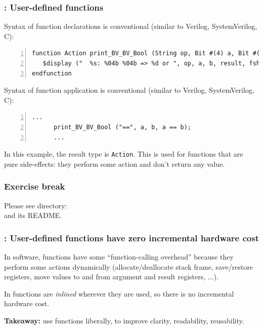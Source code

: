 \begin{frame}[fragile]
\frametitle{{\BSV}: User-defined functions}

\footnotesize

Syntax of function declarations is conventional (similar to Verilog,
SystemVerilog, C):

\begin{Verbatim}[frame=single, numbers=left]
function Action print_BV_BV_Bool (String op, Bit #(4) a, Bit #(4) b, Bool result);
   $display ("  %s: %04b %04b => %d or ", op, a, b, result, fshow (result));
endfunction
\end{Verbatim}

\vspace{4ex}

Syntax of function application is conventional (similar to Verilog,
SystemVerilog, C):

\begin{Verbatim}[frame=single, numbers=left]
      ...
      print_BV_BV_Bool ("==", a, b, a == b);
      ...
\end{Verbatim}

\vspace{2ex}

In this example, the result type is {\tt Action}.  This is used for
functions that are pure side-effects: they perform some action and
don't return any value.

\end{frame}


\begin{frame}
\frametitle{\EmojiExercise \hmm Exercise break}

Please see directory:  \\
and its README.
\end{frame}


\begin{frame}[fragile]
\frametitle{{\BSV}: User-defined functions have zero incremental hardware cost}

\footnotesize

In software, functions have some ``function-calling overhead'' because
they perform some actions dynamically (allocate/deallocate stack
frame, save/restore registers, move values to and from argument and
result registers, ...).

\vfill

In {\BSV} functions are \emph{inlined} wherever they are used, so
there is no incremental hardware cost.

\vfill

{\bf Takeaway:} use functions liberally, to improve clarity, readability, reusability.

\end{frame}

